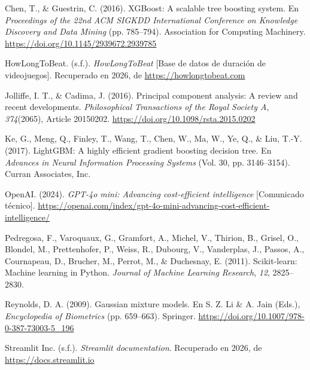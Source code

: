 \documentclass[11pt,letterpaper]{article}
\begin{document}
\begin{list}{}{\setlength{\leftmargin}{1.5em}\setlength{\itemindent}{-1.5em}\setlength{\itemsep}{0.7em}\setlength{\parsep}{0pt}}

\item Chen, T., \& Guestrin, C. (2016). XGBoost: A scalable tree boosting system. En \textit{Proceedings of the 22nd ACM SIGKDD International Conference on Knowledge Discovery and Data Mining} (pp. 785--794). Association for Computing Machinery. \url{https://doi.org/10.1145/2939672.2939785}

\item HowLongToBeat. (s.f.). \textit{HowLongToBeat} [Base de datos de duración de videojuegos]. Recuperado en 2026, de \url{https://howlongtobeat.com}

\item Jolliffe, I. T., \& Cadima, J. (2016). Principal component analysis: A review and recent developments. \textit{Philosophical Transactions of the Royal Society A}, \textit{374}(2065), Article 20150202. \url{https://doi.org/10.1098/rsta.2015.0202}

\item Ke, G., Meng, Q., Finley, T., Wang, T., Chen, W., Ma, W., Ye, Q., \& Liu, T.-Y. (2017). LightGBM: A highly efficient gradient boosting decision tree. En \textit{Advances in Neural Information Processing Systems} (Vol. 30, pp. 3146--3154). Curran Associates, Inc.

\item OpenAI. (2024). \textit{GPT-4o mini: Advancing cost-efficient intelligence} [Comunicado técnico]. \url{https://openai.com/index/gpt-4o-mini-advancing-cost-efficient-intelligence/}

\item Pedregosa, F., Varoquaux, G., Gramfort, A., Michel, V., Thirion, B., Grisel, O., Blondel, M., Prettenhofer, P., Weiss, R., Dubourg, V., Vanderplas, J., Passos, A., Cournapeau, D., Brucher, M., Perrot, M., \& Duchesnay, E. (2011). Scikit-learn: Machine learning in Python. \textit{Journal of Machine Learning Research}, \textit{12}, 2825--2830.

\item Reynolds, D. A. (2009). Gaussian mixture models. En S. Z. Li \& A. Jain (Eds.), \textit{Encyclopedia of Biometrics} (pp. 659--663). Springer. \url{https://doi.org/10.1007/978-0-387-73003-5_196}

\item Streamlit Inc. (s.f.). \textit{Streamlit documentation}. Recuperado en 2026, de \url{https://docs.streamlit.io}


\end{list}
\end{document}
